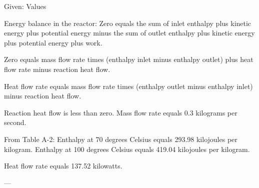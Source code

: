 Given: Values  

Energy balance in the reactor:  
Zero equals the sum of inlet enthalpy plus kinetic energy plus potential energy minus the sum of outlet enthalpy plus kinetic energy plus potential energy plus work.  

Zero equals mass flow rate times (enthalpy inlet minus enthalpy outlet) plus heat flow rate minus reaction heat flow.  

Heat flow rate equals mass flow rate times (enthalpy outlet minus enthalpy inlet) minus reaction heat flow.  

Reaction heat flow is less than zero.  
Mass flow rate equals 0.3 kilograms per second.  

From Table A-2:  
Enthalpy at 70 degrees Celsius equals 293.98 kilojoules per kilogram.  
Enthalpy at 100 degrees Celsius equals 419.04 kilojoules per kilogram.  

Heat flow rate equals 137.52 kilowatts.  

---